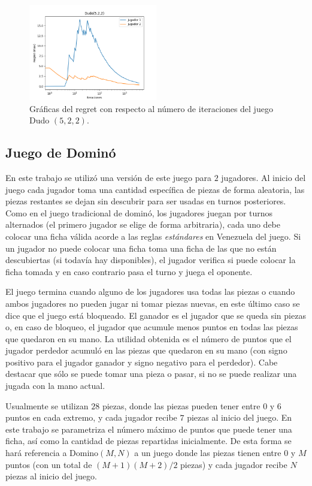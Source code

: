 \begin{figure}[h]
    \centering
    \includegraphics[width=0.5\textwidth]{graficas/cfr/dudo/Dudo(5,2,2).png}
    \caption{Gráficas del regret con respecto al número de iteraciones del juego Dudo $(5, 2, 2)$.}
    \label{fig:cfr-regret-dudo-5-2-2}
\end{figure}

\subsection*{Juego de Dominó}
En este trabajo se utilizó una versión de este juego para $2$ jugadores. Al inicio del juego cada jugador toma una cantidad específica de piezas de forma aleatoria, las piezas restantes se dejan sin descubrir para ser usadas en turnos posteriores. Como en el juego tradicional de dominó, los jugadores juegan por turnos alternados (el primero jugador se elige de forma arbitraria), cada uno debe colocar una ficha válida acorde a las reglas \textit{estándares} en Venezuela del juego. Si un jugador no puede colocar una ficha toma una ficha de las que no están descubiertas (si todavía hay disponibles), el jugador verifica si puede colocar la ficha tomada y en caso contrario pasa el turno y juega el oponente.

El juego termina cuando alguno de los jugadores usa todas las piezas o cuando ambos jugadores no pueden jugar ni tomar piezas nuevas, en este último caso se dice que el juego está bloqueado. El ganador es el jugador que se queda sin piezas o, en caso de bloqueo, el jugador que acumule menos puntos en todas las piezas que quedaron en su mano. La utilidad obtenida es el número de puntos que el jugador perdedor acumuló en las piezas que quedaron en su mano (con signo positivo para el jugador ganador y signo negativo para el perdedor). Cabe destacar que sólo se puede tomar una pieza o pasar, si no se puede realizar una jugada con la mano actual.

Usualmente se utilizan $28$ piezas, donde las piezas pueden tener entre $0$ y $6$ puntos en cada extremo, y cada jugador recibe $7$ piezas al inicio del juego. En este trabajo se parametriza el número máximo de puntos que puede tener una ficha, así como la cantidad de piezas repartidas inicialmente. De esta forma se hará referencia a Domino$(M, N)$ a un juego donde las piezas tienen entre $0$ y $M$ puntos (con un total de $(M+1)(M+2)/2$ piezas) y cada jugador recibe $N$ piezas al inicio del juego.

